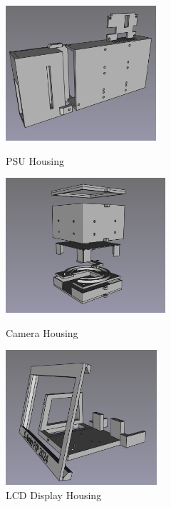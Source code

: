 
\begin{figure}
  \begin{minipage}[t]{0.32\textwidth}
    \centering
    \includegraphics[width=\textwidth,height=5cm]{imgs/freecad/psu_mount.jpg}
    \caption{PSU Housing}
  \end{minipage}
  \hfill
  \begin{minipage}[t]{0.32\textwidth}
    \centering
    \includegraphics[width=\textwidth,height=5cm]{imgs/freecad/camera_case.jpg}
    \caption{Camera Housing}
    \label{fig:camerahousing}
  \end{minipage}
  \hfill
  \begin{minipage}[t]{0.32\textwidth}
    \centering
    \includegraphics[width=\textwidth,height=5cm]{imgs/freecad/lcd_mount.jpg}
    \caption{LCD Display Housing}
  \end{minipage}
\end{figure}









